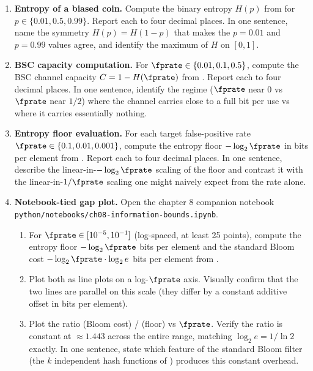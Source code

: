 \begin{enumerate}


\item \exstar
\label{ex:ch8-1}
\textbf{Entropy of a biased coin.}
Compute the binary entropy $H(p)$ from  for
$p \in \{0.01, 0.5, 0.99\}$. Report each to four decimal places. In
one sentence, name the symmetry $H(p) = H(1 - p)$ that makes the
$p = 0.01$ and $p = 0.99$ values agree, and identify the maximum of
$H$ on $[0, 1]$.

\item \exstar
\label{ex:ch8-2}
\textbf{BSC capacity computation.}
For $\fprate \in \{0.01, 0.1, 0.5\}$, compute the BSC channel
capacity $C = 1 - H(\fprate)$ from . Report
each to four decimal places. In one sentence, identify the regime
($\fprate$ near $0$ vs $\fprate$ near $1/2$) where the channel
carries close to a full bit per use vs where it carries essentially
nothing.

\item \exstar
\label{ex:ch8-3}
\textbf{Entropy floor evaluation.}
For each target false-positive rate $\fprate \in \{0.1, 0.01,
0.001\}$, compute the entropy floor $-\log_2 \fprate$ in bits per
element from . Report each to four decimal
places. In one sentence, describe the linear-in-$-\log_2 \fprate$
scaling of the floor and contrast it with the linear-in-$1/\fprate$
scaling one might naively expect from the rate alone.


\item \exstarstar
\label{ex:ch8-4}
\textbf{Notebook-tied gap plot.}
Open the chapter 8 companion notebook
\texttt{python/notebooks/ch08-information-bounds.ipynb}.
\begin{enumerate}
  \item[(a)] For $\fprate \in [10^{-5}, 10^{-1}]$ (log-spaced, at
    least 25 points), compute the entropy floor $-\log_2 \fprate$
    bits per element and the standard Bloom cost
    $-\log_2 \fprate \cdot \log_2 e$ bits per element from
    .
  \item[(b)] Plot both as line plots on a log-$\fprate$ axis.
    Visually confirm that the two lines are parallel on this scale
    (they differ by a constant additive offset in bits per
    element).
  \item[(c)] Plot the ratio (Bloom cost) / (floor) vs $\fprate$.
    Verify the ratio is constant at $\approx 1.443$ across the
    entire range, matching $\log_2 e = 1/\ln 2$ exactly. In one
    sentence, state which feature of the standard Bloom filter
    (the $k$ independent hash functions of )
    produces this constant overhead.
\end{enumerate}


\end{enumerate}
